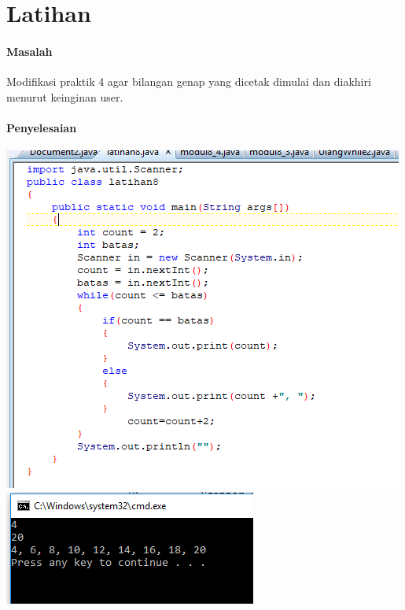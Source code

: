 \documentclass[a4paper,12pt]{article}
\begin{document}
\section{Latihan}
\paragraph{Masalah\\}
Modifikasi praktik 4 agar bilangan genap yang dicetak dimulai dan diakhiri menurut
keinginan user.

\paragraph{Penyelesaian\\}
\begin{center}
	\includegraphics[scale=.7]{Capture10}\\
	\includegraphics[scale=1]{Capture11}
\end{center}
\end{document}
